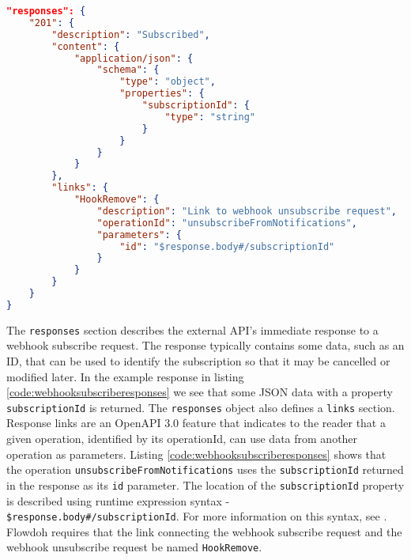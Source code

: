 \begin{minipage}{\textwidth}
\begin{lstlisting}[caption={Webhook subscribe request - the responses section},label={code:webhooksubscriberesponses},language=json]
"responses": {
    "201": {
        "description": "Subscribed",
        "content": {
            "application/json": {
                "schema": {
                    "type": "object",
                    "properties": {
                        "subscriptionId": {
                            "type": "string"
                        }
                    }
                }
            }
        },
        "links": {
            "HookRemove": {
                "description": "Link to webhook unsubscribe request",
                "operationId": "unsubscribeFromNotifications",
                "parameters": {
                    "id": "$response.body#/subscriptionId"
                }
            }
        }
    }
}
\end{lstlisting}
\end{minipage}
The \texttt{responses} section describes the external API's immediate response to a webhook subscribe request. The response typically contains some data, such as an ID, that can be used to identify the subscription so that it may be cancelled or modified later. In the example response in listing \ref{code:webhooksubscriberesponses} we see that some JSON data with a property \texttt{subscriptionId} is returned. The \texttt{responses} object also defines a \texttt{links} section. Response links\cite{linkedoperations} are an OpenAPI 3.0 feature that indicates to the reader that a given operation, identified by its operationId, can use data from another operation as parameters. Listing \ref{code:webhooksubscriberesponses} shows that the operation \texttt{unsubscribeFromNotifications} uses the \texttt{subscriptionId} returned in the response as its \texttt{id} parameter. The location of the \texttt{subscriptionId} property is described using runtime expression syntax - \texttt{\$response.body\#/subscriptionId}. For more information on this syntax, see \cite{runtimeexpressions}. Flowdoh requires that the link connecting the webhook subscribe request and the webhook unsubscribe request be named \texttt{HookRemove}.

